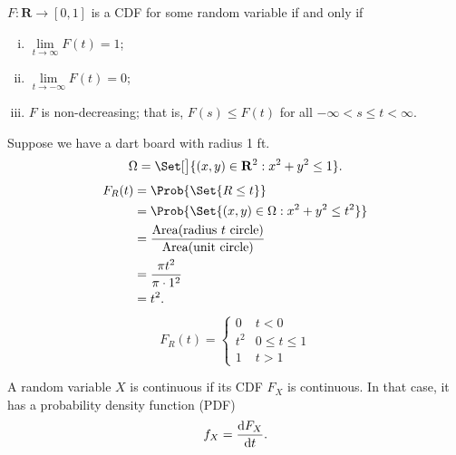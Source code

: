 \begin{Theorem}{}{}
    $ F\colon\mathbf{R}\to[0,1] $ is a CDF for some random variable
    if and only if
    \begin{enumerate}[(i)]
        \item $ \lim\limits_{{t} \to {\infty}}F(t)=1 $;
        \item $ \lim\limits_{{t} \to {-\infty}}F(t)=0 $;
        \item $ F $ is non-decreasing; that is, $ F(s)\le F(t) $ for all $ -\infty<s\le t<\infty $.
    \end{enumerate}
\end{Theorem}
\begin{Example}{}{}
    Suppose we have a dart board with radius 1 ft.
    \[ \Omega=\Set[\big]{(x,y)\in\mathbf{R}^2:x^2+y^2\le 1}. \]
    \begin{align*}
        F_R(t)
         & =\Prob{\Set{R\le t}}                                                           \\
         & =\Prob{\Set{(x,y)\in \Omega:x^2+y^2\le t^2}}                                   \\
         & =\frac{\text{Area}(\text{radius $t$ circle})}{\text{Area}(\text{unit circle})} \\
         & =\frac{\pi t^2}{\pi\cdot 1^2}                                                  \\
         & =t^2.
    \end{align*}
    \[ F_R(t)=\begin{cases}
            0   & t<0         \\
            t^2 & 0\le t\le 1 \\
            1   & t>1
        \end{cases} \]
\end{Example}
\begin{Definition}{}{}
    A random variable $ X $ is continuous if its CDF $ F_X $
    is continuous. In that case, it has a probability density function (PDF)
    \[ f_X=\odv{F_X}{t}. \]
\end{Definition}